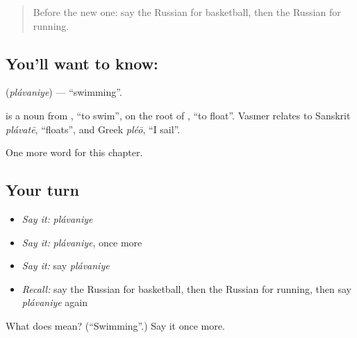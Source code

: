\label{lesson:RU-C252-plavaniye}



\begin{quote}
Before the new one: say the Russian for basketball, then the Russian for running.
\end{quote}

\subsection*{You'll want to know: }
\textbf{} (\emph{plávaniye}) — \textquotedblleft{}swimming\textquotedblright{}.

\begin{cousinweb}
\textbf{} is a noun from \emph{}, \textquotedblleft{}to swim\textquotedblright{}, on the root of \emph{}, \textquotedblleft{}to float\textquotedblright{}. Vasmer relates \emph{} to Sanskrit \emph{plávatē}, \textquotedblleft{}floats\textquotedblright{}, and Greek \emph{pléō}, \textquotedblleft{}I sail\textquotedblright{}.
\end{cousinweb}

\begin{grammarlens}[title={What you've built}]
One more word for this chapter.
\end{grammarlens}

\subsection*{Your turn}
\begin{itemize}
\raggedright
  \item \emph{Say it:} \emph{plávaniye}
  \item \emph{Say it:} \emph{plávaniye}, once more
  \item \emph{Say it:} say \emph{plávaniye}
  \item \emph{Recall:} say the Russian for basketball, then the Russian for running, then say \emph{plávaniye} again
\end{itemize}

\begin{tcolorbox}[breakable,colback=teal!4,colframe=teal!35!black,title={Before you move on}]
What does  mean? (\textquotedblleft{}Swimming\textquotedblright{}.) Say it once more.
\end{tcolorbox}

